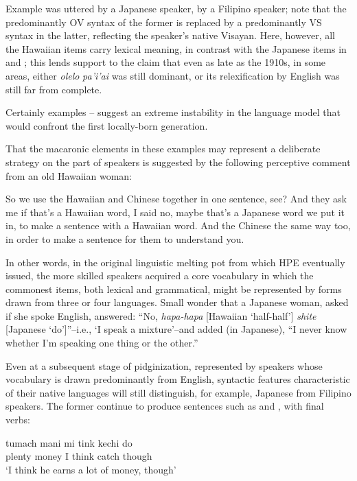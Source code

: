 \noindent Example  was uttered by a Japanese speaker,  by a Filipino speaker; note that the predominantly OV syntax of the former is replaced by a predominantly VS syntax in the latter, reflecting the speaker's native Visayan. Here, however, all the Hawaiian items carry lexical meaning, in contrast with the Japanese items in  and ; this lends support to the claim that even as late as the 1910s, in some areas, either \textit{olelo} \textit{pa'i'ai} was still dominant, or its relexification by English was still far from complete.

Certainly examples -- suggest an extreme instability in the language model that would confront the first locally-born generation.

That the macaronic elements in these examples may represent a deliber\-ate strategy on the part of speakers is suggested by the following perceptive comment from an old Hawaiian woman:

\ea\label{ex:5}
 So we use the Hawaiian and Chinese together in one sentence, see? And they ask me if that's a Hawaiian word, I said no, maybe that's a Japanese word we put it in, to make a sentence with a Hawaiian word. And the Chinese the same way too, in order to make a sentence for them to understand you.
\z

\noindent In other words, in the original linguistic melting pot from which HPE eventually issued, the more skilled speakers acquired a core vocabulary in which the commonest items, both lexical and grammatical, might be represented by forms drawn from three or four languages. Small wonder that a Japanese woman, asked if she spoke English, answered: ``No, \textit{hapa-hapa} [Hawaiian `half-half'] \textit{shite} [Japanese `do']''--i.e., `I speak a mixture'--and added (in Japanese), ``I never know whether I'm speaking one thing or the other.''

Even at a subsequent stage of pidginization, represented by speakers whose vocabulary is drawn predominantly from English, syntactic features characteristic of their native languages will still distinguish, for example, Japanese from Filipino speakers. The former continue to produce sentences such as  and , with final verbs:

\ea\label{ex:6}
\gll tumach mani mi tink kechi do\\
 plenty money I think catch though\\
\glt  `I think he earns a lot of money, though'
\z

